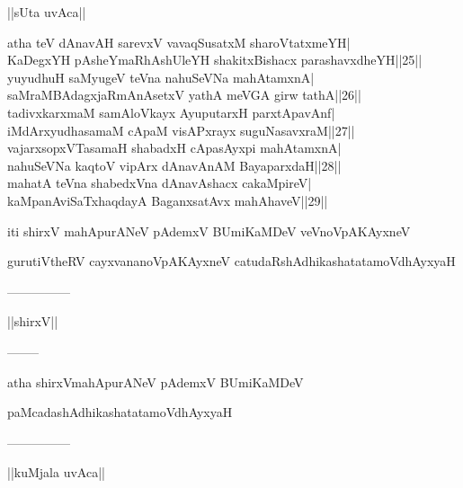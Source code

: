 \documentclass{article}
\begin{document}
\begin{center}
||sUta uvAca||
\end{center}

atha teV dAnavAH sarevxV vavaqSusatxM sharoVtatxmeYH|\\
KaDegxYH pAsheYmaRhAshUleYH shakitxBishacx parashavxdheYH||25||\\
yuyudhuH saMyugeV teVna nahuSeVNa mahAtamxnA|\\
saMraMBAdagxjaRmAnAsetxV yathA meVGA girw tathA||26||\\
tadivxkarxmaM samAloVkayx AyuputarxH parxtApavAnf|\\
iMdArxyudhasamaM cApaM visAPxrayx suguNasavxraM||27||\\
vajarxsopxVTasamaH shabadxH cApasAyxpi mahAtamxnA|\\
nahuSeVNa kaqtoV vipArx dAnavAnAM BayaparxdaH||28||\\
mahatA teVna shabedxVna dAnavAshacx cakaMpireV|\\
kaMpanAviSaTxhaqdayA BaganxsatAvx mahAhaveV||29||

\begin{center}
iti shirxV mahApurANeV pAdemxV BUmiKaMDeV veVnoVpAKAyxneV
\end{center}

\begin{center}
gurutiVtheRV cayxvananoVpAKAyxneV catudaRshAdhikashatatamoVdhAyxyaH
\end{center}

\begin{center}
---------------
\end{center}

\begin{center}
||shirxV||
\end{center}

\begin{center}
--------
\end{center}

\begin{center}
atha shirxVmahApurANeV pAdemxV BUmiKaMDeV
\end{center}

\begin{center}
paMcadashAdhikashatatamoVdhAyxyaH
\end{center}

\begin{center}
---------------
\end{center}

\begin{center}
||kuMjala uvAca||
\end{center}
\end{document}
